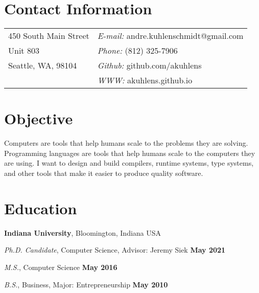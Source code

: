 \documentclass[resmargin,line]{res}
\newenvironment{list1}{
  \begin{list}{\ding{113}}{%
      \setlength{\itemsep}{0in}
      \setlength{\parsep}{0in} \setlength{\parskip}{0in}
      \setlength{\topsep}{0in} \setlength{\partopsep}{0in} 
      \setlength{\leftmargin}{0.17in}}}{\end{list}}
\begin{document}

\begin{resume}
\section{\sc Contact Information}
\vspace{.05in}
\begin{tabular}{@{}p{2in}p{4in}}
450 South Main Street      & {\it E-mail:} andre.kuhlenschmidt@gmail.com \\
Unit 803                           & {\it Phone:}  (812) 325-7906 \\
Seattle, WA, 98104          & {\it Github:} github.com/akuhlens  \\       
                                       & {\it WWW:} akuhlens.github.io \\     
\end{tabular}

\section{\sc Objective }
Computers are tools that help humans scale to the problems they are
solving. Programming languages are tools that help humans scale to the
computers they are using. I want to design and build compilers,
runtime systems, type systems, and other tools that make it easier
to produce quality software. 

\section{\sc Education}
{\bf Indiana University},
Bloomington, Indiana USA\\
\vspace*{-.15in}
\begin{list1}
\item[] {\em Ph.D. Candidate}, Computer Science, Advisor: Jeremy Siek \hfill{} {\bf May 2021}
\item[] {\em M.S.}, Computer Science  \hfill {\bf May 2016}
\item[] {\em B.S.}, Business, Major: Entrepreneurship \hfill{} {\bf May 2010}
\end{list1}



\end{resume}
\end{document}
